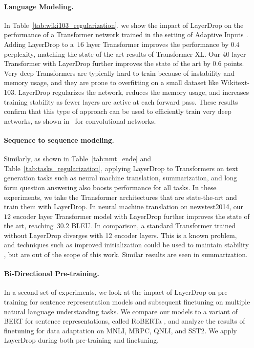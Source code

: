 \paragraph{Language Modeling.} In Table~\ref{tab:wiki103_regularization}, we show the impact of LayerDrop on the performance of a Transformer network trained in the setting of Adaptive Inputs~\citep{baevski2018adaptive}.
Adding LayerDrop to a~$16$ layer Transformer improves the performance by $0.4$ perplexity, matching the state-of-the-art results of Transformer-XL.
Our $40$ layer Transformer with LayerDrop further improves the state of the art by $0.6$ points.
Very deep Transformers are typically hard to train because of instability and memory usage, and they are prone to overfitting on a small dataset like Wikitext-103.
LayerDrop regularizes the network, reduces the memory usage, and increases training stability as fewer layers are active at each forward pass.
These results confirm that this type of approach can be used to efficiently train very deep networks, as shown in~\citet{huang2016deep} for convolutional networks.

\paragraph{Sequence to sequence modeling.} Similarly, as shown in Table~\ref{tab:nmt_ende} and Table~\ref{tab:tasks_regularization}, applying LayerDrop to Transformers on text generation tasks such as neural machine translation, summarization, and long form question answering also boosts performance for all tasks.
In these experiments, we take the Transformer architectures that are state-the-art and train them with LayerDrop.
In neural machine translation on newstest2014, our~$12$ encoder layer Transformer model with LayerDrop further improves the state of the art, reaching~$30.2$ BLEU. In comparison, a standard Transformer trained without LayerDrop diverges with 12 encoder layers. This is a known problem, and techniques such as improved initialization could be used to maintain stability \citep{junczys2019microsoft,zhang2019fixup}, but are out of the scope of this work. Similar results are seen in summarization.

\paragraph{Bi-Directional Pre-training.}
In a second set of experiments, we look at the impact of LayerDrop on pre-training for sentence representation models and subsequent finetuning on multiple natural language understanding tasks. We compare our models to a variant of BERT for sentence representations, called RoBERTa \citep{liu2019roberta}, and analyze the results of finetuning for data adaptation on MNLI, MRPC, QNLI, and SST2.
We apply LayerDrop during both pre-training and finetuning.

